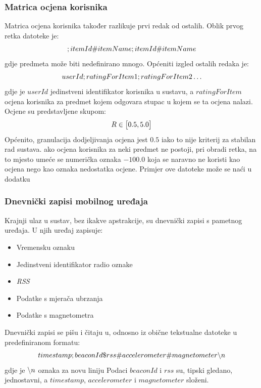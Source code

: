 \documentclass[times, utf8, diplomski, numeric]{fer}
\begin{document}
\subsubsection{Matrica ocjena korisnika}
Matrica ocjena korisnika također razlikuje prvi redak od ostalih. 
Oblik prvog retka datoteke je:
\begin{equation}
	\centering
	;itemId\#itemName;itemId\#itemName
\end{equation}
gdje predmeta može biti nedefinirano mnogo. Općeniti izgled ostalih redaka je:
\begin{equation}
	\centering
	userId;ratingForItem1;ratingForItem2 \ldots
\end{equation}
gdje je $userId$ jedinstveni identifikator korisnika u sustavu, a
$ratingForItem$ ocjena korisnika za predmet kojem odgovara stupac u kojem se ta
ocjena nalazi. Ocjene su predstavljene skupom:
\begin{equation}
	\centering
	R \in \big[ 0.5, 5.0 \big]
\end{equation}
Općenito, granulacija dodjeljivanja ocjena jest $0.5$ iako to nije kriterij za
stabilan rad sustava. ako ocjena korisnika za neki predmet ne postoji, pri
obradi retka, na to mjesto umeće se numerička oznaka $-100.0$ koja se naravno
ne koristi kao ocjena nego kao oznaka nedostatka ocjene. Primjer ove datoteke
može se naći u dodatku

\subsubsection{Dnevnički zapisi mobilnog uređaja}
Krajnji ulaz u sustav, bez ikakve apstrakcije, su dnevnički zapisi  s
pametnog uređaja. U njih uređaj zapisuje:
\begin{itemize}
  \item Vremensku oznaku
  \item Jedinstveni identifikator radio oznake
  \item \emph{RSS} 
  \item Podatke s mjerača ubrzanja 
  \item Podatke s magnetometra 
\end{itemize}
Dnevnički zapisi se pišu i čitaju u, odnosno iz obične tekstualne datoteke u
predefiniranom formatu:
\begin{equation}
	\centering
	timestamp;beaconId\$rss\#accelerometer\#magnetometer\char`\\n
\end{equation}
gdje je $\char`\\n$ oznaka za novu liniju 
Podaci $beaconId$ i $rss$ su, tipski gledano, jednostavni, a $timestamp$,
$accelerometer$ i $magnetometer$ složeni.
\end{document}
